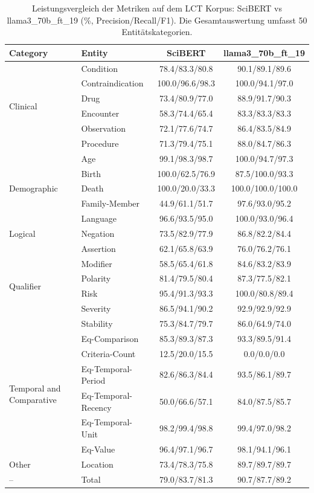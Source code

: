 
\begin{table}[htbp]
\centering
\begin{tabular}{llcc}
\toprule
\textbf{Category} & \textbf{Entity} & \textbf{SciBERT} & \textbf{llama3_70b_ft_19} \\
\midrule
\multirow{6}{*}{Clinical} & Condition & 78.4/83.3/80.8 & 90.1/89.1/89.6 \\
 & Contraindication & 100.0/96.6/98.3 & 100.0/94.1/97.0 \\
 & Drug & 73.4/80.9/77.0 & 88.9/91.7/90.3 \\
 & Encounter & 58.3/74.4/65.4 & 83.3/83.3/83.3 \\
 & Observation & 72.1/77.6/74.7 & 86.4/83.5/84.9 \\
 & Procedure & 71.3/79.4/75.1 & 88.0/84.7/86.3 \\
\midrule
\multirow{5}{*}{Demographic} & Age & 99.1/98.3/98.7 & 100.0/94.7/97.3 \\
 & Birth & 100.0/62.5/76.9 & 87.5/100.0/93.3 \\
 & Death & 100.0/20.0/33.3 & 100.0/100.0/100.0 \\
 & Family-Member & 44.9/61.1/51.7 & 97.6/93.0/95.2 \\
 & Language & 96.6/93.5/95.0 & 100.0/93.0/96.4 \\
\midrule
Logical & Negation & 73.5/82.9/77.9 & 86.8/82.2/84.4 \\
\midrule
\multirow{6}{*}{Qualifier} & Assertion & 62.1/65.8/63.9 & 76.0/76.2/76.1 \\
 & Modifier & 58.5/65.4/61.8 & 84.6/83.2/83.9 \\
 & Polarity & 81.4/79.5/80.4 & 87.3/77.5/82.1 \\
 & Risk & 95.4/91.3/93.3 & 100.0/80.8/89.4 \\
 & Severity & 86.5/94.1/90.2 & 92.9/92.9/92.9 \\
 & Stability & 75.3/84.7/79.7 & 86.0/64.9/74.0 \\
\midrule
\multirow{6}{*}{Temporal and Comparative} & Eq-Comparison & 85.3/89.3/87.3 & 93.3/89.5/91.4 \\
 & Criteria-Count & 12.5/20.0/15.5 & 0.0/0.0/0.0 \\
 & Eq-Temporal-Period & 82.6/86.3/84.4 & 93.5/86.1/89.7 \\
 & Eq-Temporal-Recency & 50.0/66.6/57.1 & 84.0/87.5/85.7 \\
 & Eq-Temporal-Unit & 98.2/99.4/98.8 & 99.4/97.0/98.2 \\
 & Eq-Value & 96.4/97.1/96.7 & 98.1/94.1/96.1 \\
\midrule
Other & Location & 73.4/78.3/75.8 & 89.7/89.7/89.7 \\
\midrule
-- & Total & 79.0/83.7/81.3 & 90.7/87.7/89.2 \\
\bottomrule
\end{tabular}
\caption{Leistungsvergleich der Metriken auf dem LCT Korpus: SciBERT vs llama3_70b_ft_19 (\%, Precision/Recall/F1). Die Gesamtauswertung umfasst 50 Entitätskategorien.}
\label{tab:metrics_comparison}
\end{table}
    